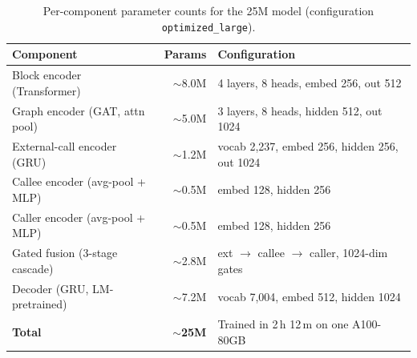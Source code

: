 
\begin{table}[t]
\centering
\small
\caption{Per-component parameter counts for the 25M \sysname{} model (configuration \texttt{optimized\_large}).}
\label{tab:params}
\begin{tabular}{lrl}
\toprule
Component & Params & Configuration \\
\midrule
Block encoder (Transformer)           &  $\sim$8.0M & 4 layers, 8 heads, embed 256, out 512 \\
Graph encoder (GAT, attn pool)        &  $\sim$5.0M & 3 layers, 8 heads, hidden 512, out 1024 \\
External-call encoder (GRU)           &  $\sim$1.2M & vocab 2{,}237, embed 256, hidden 256, out 1024 \\
Callee encoder (avg-pool + MLP)       &  $\sim$0.5M & embed 128, hidden 256 \\
Caller encoder (avg-pool + MLP)       &  $\sim$0.5M & embed 128, hidden 256 \\
Gated fusion (3-stage cascade)        &  $\sim$2.8M & ext $\to$ callee $\to$ caller, 1024-dim gates \\
Decoder (GRU, LM-pretrained)          &  $\sim$7.2M & vocab 7{,}004, embed 512, hidden 1024 \\
\midrule
\textbf{Total}                         & \textbf{$\sim$25M} & Trained in 2\,h 12\,m on one A100-80GB \\
\bottomrule
\end{tabular}
\end{table}


